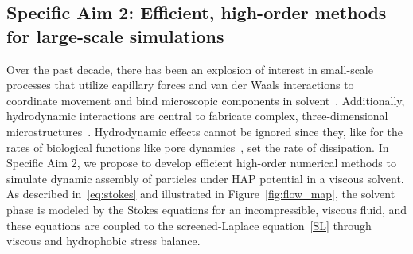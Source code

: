 \subsection{Specific Aim 2: Efficient, high-order methods for large-scale simulations}
Over the past decade, there has been an explosion of interest in
small-scale processes that utilize capillary forces and van der Waals
interactions to coordinate movement
and bind microscopic components in solvent~\cite{Pandey2011, Zhang2017, Siontorou2017}.
Additionally, hydrodynamic interactions are central to fabricate complex,
three-dimensional microstructures~\cite{Dasgupta2017, Leong2007, Reynolds2019, Cho2010}.
Hydrodynamic effects cannot
be ignored since they, like for the rates of biological functions 
like pore dynamics~\cite{RYHAM20112929}, set the rate of dissipation.
%
In Specific Aim 2, we propose to develop efficient high-order numerical
methods to simulate dynamic assembly of particles under HAP potential in
a viscous solvent. 
%
%
%
%
%
As described in~\eqref{eq:stokes} and illustrated in
Figure~\ref{fig:flow_map}, the solvent phase is modeled by the Stokes
equations for an incompressible, viscous fluid, and these equations are
coupled to the screened-Laplace equation~\eqref{SL} through viscous and
hydrophobic stress balance. 
 


